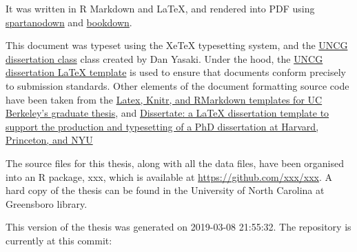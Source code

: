 \documentclass[ms]{uncgdissertationexp}
\theoremstyle{plain}
\theoremstyle{definition}
\theoremstyle{remark}
\begin{document}
  It was written in R Markdown and LaTeX, and rendered into PDF using
  \href{https://github.com/ashley-williams/spartanodown}{spartanodown} and
  \href{https://github.com/rstudio/bookdown}{bookdown}.
  
  This document was typeset using the XeTeX typesetting system, and the
  \href{https://mathstats.uncg.edu/wp-content/uploads/2018/08/uncgdissertationexp.cls}{UNCG
  dissertation class} class created by Dan Yasaki. Under the hood, the
  \href{https://mathstats.uncg.edu/wp-content/uploads/2018/08/sample.tex}{UNCG
  dissertation LaTeX template} is used to ensure that documents conform
  precisely to submission standards. Other elements of the document
  formatting source code have been taken from the
  \href{https://github.com/stevenpollack/ucbthesis}{Latex, Knitr, and
  RMarkdown templates for UC Berkeley's graduate thesis}, and
  \href{https://github.com/suchow/Dissertate}{Dissertate: a LaTeX
  dissertation template to support the production and typesetting of a PhD
  dissertation at Harvard, Princeton, and NYU}
  
  The source files for this thesis, along with all the data files, have
  been organised into an R package, xxx, which is available at
  \url{https://github.com/xxx/xxx}. A hard copy of the thesis can be found
  in the University of North Carolina at Greensboro library.
  
  This version of the thesis was generated on 2019-03-08 21:55:32. The
  repository is currently at this commit:
  
\end{document}
